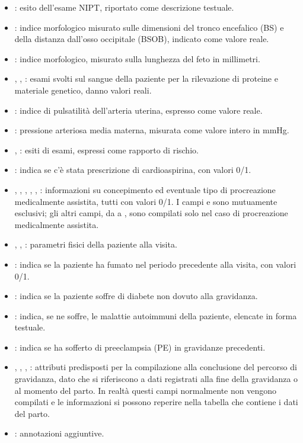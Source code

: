 \begin{itemize}
\item {}: esito dell'esame NIPT, riportato come descrizione testuale.
\item {}: indice morfologico misurato sulle dimensioni del tronco encefalico (BS) e della distanza dall'osso occipitale (BSOB), indicato come valore reale.
\item {}: indice morfologico, misurato sulla lunghezza del feto in millimetri.
\item {}, , : esami svolti sul sangue della paziente per la rilevazione di proteine e materiale genetico, danno valori reali.
\item {}: indice di pulsatilità dell'arteria uterina, espresso come valore reale.
\item {}: pressione arteriosa media materna, misurata come valore intero in mmHg.
\item {}, : esiti di esami, espressi come rapporto di rischio.
\item {}: indica se c'è stata prescrizione di cardioaspirina, con valori 0/1.
\item {}, , , , , : informazioni su concepimento ed eventuale tipo di procreazione medicalmente assistita, tutti con valori 0/1.
I campi  e  sono mutuamente esclusivi; gli altri campi, da  a , sono compilati solo nel caso di procreazione medicalmente assistita.
\item {}, , : parametri fisici della paziente alla visita.
\item {}: indica se la paziente ha fumato nel periodo precedente alla visita, con valori 0/1.
\item {}: indica se la paziente soffre di diabete non dovuto alla gravidanza.
\item {}: indica, se ne soffre, le malattie autoimmuni della paziente, elencate in forma testuale.
\item {}: indica se ha sofferto di preeclampsia (PE) in gravidanze precedenti.
\item {}, , , : attributi predisposti per la compilazione alla conclusione del percorso di gravidanza, dato che si riferiscono a dati registrati alla fine della gravidanza o al momento del parto. In realtà questi campi normalmente non vengono compilati e le informazioni si possono reperire nella tabella che contiene i dati del parto.
\item {}: annotazioni aggiuntive.
\end{itemize}

